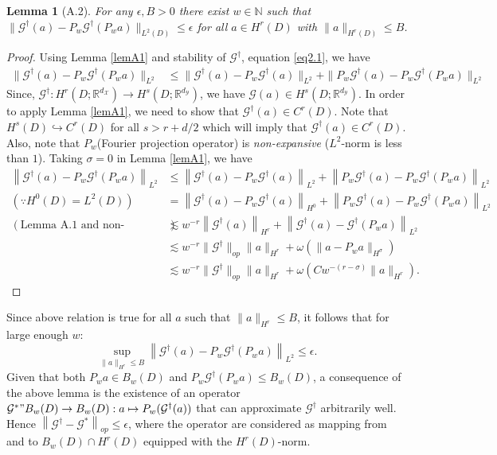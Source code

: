 \documentclass[reqno,10pt]{amsart}
\theoremstyle{plain}
\newtheorem*{lem*}{Lemma}
\theoremstyle{definition}
\newcommand{\bb}[1]{\mathbb{#1}}
\newcommand{\cal}[1]{\mathcal{#1}}
\begin{document}
    \begin{lem*}[A.2]
        For any $\epsilon, B > 0$ there exist $w \in \bb N$ such that $\|\cal G^\dag(a) - P_w\cal G^\dag(P_wa)\|_{L^2(D)} \leq \epsilon$ for all $a \in H^r(D)$ with $\|a\|_{H^r(D)} \leq B$.        
    \end{lem*}
    \begin{proof}
        Using Lemma \ref{lemA1} and stability of $\cal G^\dag$, equation \ref{eq2.1}, we have
        $$
        \begin{aligned}
            \|\cal G^\dag(a) - P_w\cal G^\dag(P_wa)\|_{L^2} &\leq \|\cal G^\dag(a) - P_w\cal G^\dag(a)\|_{L^2} + \|P_w\cal G^\dag(a) - P_w\cal G^\dag(P_wa)\|_{L^2}
        \end{aligned}
        $$
        Since, $\cal G^\dag : H^r(D;\bb R^{d_{\cal X}}) \to H^s(D;\bb R^{d_{\cal Y}})$, we have $\cal G(a) \in H^s(D;\bb R^{d_{\cal Y}})$. In order to apply Lemma \ref{lemA1}, we need to show that $\cal G^\dag(a) \in C^r(D)$. Note that $H^s(D) \hookrightarrow C^r(D)$ for all $s > r + d/2$ which will imply that $\cal G^\dag (a) \in C^r(D)$. Also, note that $P_w$(Fourier projection operator) is {\it non-expansive} ($L^2$-norm is less than $1$). Taking $\sigma = 0$ in Lemma \ref{lemA1}, we have 
        \begin{equation}            
        \begin{aligned}
            \left\|\cal G^\dag(a) - P_w\cal G^\dag(P_wa)\right\|_{L^2} &\leq \left\|\cal G^\dag(a) - P_w\cal G^\dag(a)\right\|_{L^2} + \left\|P_w\cal G^\dag(a) - P_w\cal G^\dag(P_wa)\right\|_{L^2} \\
            (\because H^0(D) = L^2(D)) \qquad &= \left\|\cal G^\dag(a) - P_w\cal G^\dag(a)\right\|_{H^0} + \left\|P_w\cal G^\dag(a) - P_w\cal G^\dag(P_wa)\right\|_{L^2}\\
            (\text{Lemma A.1 and non-expansive}) \qquad &\lesssim w^{-r} \left\|\cal G^\dag (a)\right\|_{H^r} + \left\|\cal G^\dag (a) - \cal G^\dag(P_wa)\right\|_{L^2}\\
            &\lesssim w^{-r}\|\cal G^\dag\|_{op}\|a\|_{H^r} + \omega(\|a - P_wa\|_{H^\sigma})\\
            &\lesssim w^{-r}\|\cal G^\dag\|_{op}\|a\|_{H^r} + \omega (Cw^{-(r-\sigma)}\|a\|_{H^r}).
        \end{aligned}
    \end{equation}
    \end{proof}
    Since above relation is true for all $a$ such that $\|a\|_{H^r} \leq B$, it follows that for large enough $w$:
    \begin{equation}
        \sup\limits_{\|a\|_{H^r}\leq B} \left\|\cal G^\dag(a) - P_w\cal G^\dag(P_wa)\right\|_{L^2} \leq \epsilon.
    \end{equation}
    Given that both $P_wa \in B_w(D)$ and $P_w\cal G^\dag(P_wa) \leq B_w(D)$, a consequence of the above lemma is the existence of an operator $\cal G^* " B_w(D) \to B_w(D):a \mapsto P_w(\cal G^\dag(a))$ that can approximate $\cal G^\dag$ arbitrarily well. Hence $\left\|\cal G^\dag - \cal G^*\right\|_{op} \leq \epsilon$, where the operator are considered as mapping from and to $B_w(D) \cap H^r(D)$ equipped with the $H^r(D)$-norm.
\end{document}
